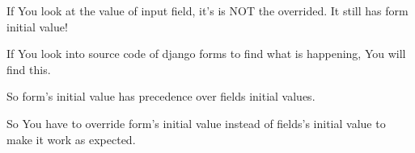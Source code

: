 \documentclass[letterpaper,11pt,english]{sphinxmanual}
\begin{document}
If You look at the value of input field, it’s is NOT the overrided. It still has form initial value!

If You look into source code of django forms to find what is happening, You will find this.

\begin{sphinxVerbatim}[commandchars=\\\{\}]
  
          
\end{sphinxVerbatim}

So form’s initial value has precedence over fields initial values.

So You have to override form’s initial value instead of fields’s initial value to make it work as expected.
\end{document}
